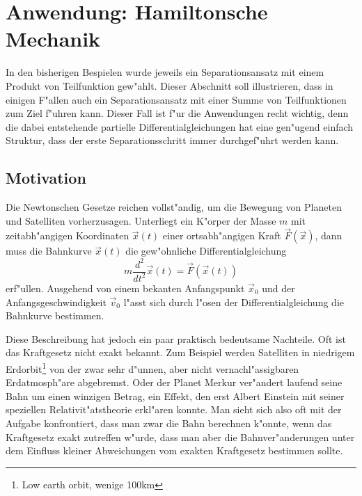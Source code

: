 %
%
%
\section{Anwendung: Hamiltonsche Mechanik\label{hamilton-mechanik}}
In den bisherigen Bespielen wurde jeweils ein Separationsansatz mit
einem Produkt von Teilfunktion gew"ahlt.
Dieser Abschnitt soll illustrieren, dass in einigen F"allen auch
ein Separationsansatz mit einer Summe von Teilfunktionen
zum Ziel f"uhren kann.
Dieser Fall ist f"ur die Anwendungen recht wichtig, denn die
dabei entstehende partielle Differentialgleichungen hat eine
gen"ugend einfach Struktur, dass der erste Separationsschritt immer
durchgef"uhrt werden kann.

\subsection{Motivation}
Die Newtonschen Gesetze reichen vollst"andig, um die Bewegung von
Planeten und Satelliten vorherzusagen.
Unterliegt
ein K"orper der Masse $m$ mit zeitabh"angigen Koordinaten $\vec x(t)$
einer ortsabh"angigen Kraft $\vec F(\vec x)$, dann muss die Bahnkurve 
$\vec x(t)$ die gew"ohnliche Differentialgleichung
\begin{equation}
m\frac{d^2}{dt^2}\vec x(t)=\vec F(\vec x(t))
\label{jacobi:newton}
\end{equation}
erf"ullen. Ausgehend von einem bekanten Anfangspunkt $\vec x_0$ und
der Anfangsgeschwindigkeit $\vec v_0$ l"asst sich durch
l"osen der Differentialgleichung die Bahnkurve bestimmen.

Diese Beschreibung hat jedoch ein paar praktisch bedeutsame Nachteile.
Oft ist das Kraftgesetz nicht exakt bekannt. Zum Beispiel werden
Satelliten in niedrigem Erdorbit\footnote{Low earth orbit, wenige 100km}
von der zwar sehr d"unnen, aber nicht vernachl"assigbaren
Erdatmosph"are abgebremst.
Oder der Planet Merkur ver"andert laufend seine Bahn um einen winzigen
Betrag, ein Effekt, den erst Albert Einstein mit seiner speziellen
Relativit"atstheorie erkl"aren konnte.
Man sieht sich also oft mit der Aufgabe konfrontiert, dass man zwar die
Bahn berechnen k"onnte, wenn das Kraftgesetz exakt zutreffen w"urde,
dass man aber die Bahnver"anderungen unter dem Einfluss kleiner
Abweichungen vom exakten Kraftgesetz bestimmen sollte.

